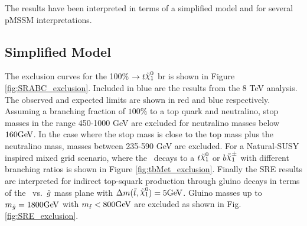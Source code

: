 The results have been interpreted in terms of a simplified model and for several pMSSM interpretations.

\subsection{Simplified Model}
The exclusion curves for the 100\% \stop $\ra t\ninoone$ \gls{br} is shown in Figure \ref{fig:SRABC_exclusion}.  Included in blue are the results from the 8 TeV analysis.  The observed and expected limits are shown in red and blue respectively.   Assuming a branching fraction of $100\%$ to a top quark and neutralino, stop masses in the range 450-1000 GeV are excluded for neutralino masses below $160\GeV$. In the case where the stop mass is close to the top mass plus the neutralino mass, masses between 235-590 GeV are excluded.  For a Natural-SUSY inspired mixed grid scenario, where the \stop\ decays to a $t\ninoone$ or $b\chinoonepm$ with different branching ratios is shown in Figure \ref{fig:tbMet_exclusion}.  Finally the SRE results are interpreted for indirect top-squark production through gluino decays in terms of the \stop\ vs.\ $\tilde{g}$ mass plane with $\Delta m(\stop,\ninoone)=5\GeV$. Gluino masses up to $m_{\gluino}=1800\GeV$ with $\mstop<800\GeV$ are excluded as shown in Fig. \ref{fig:SRE_exclusion}. 

